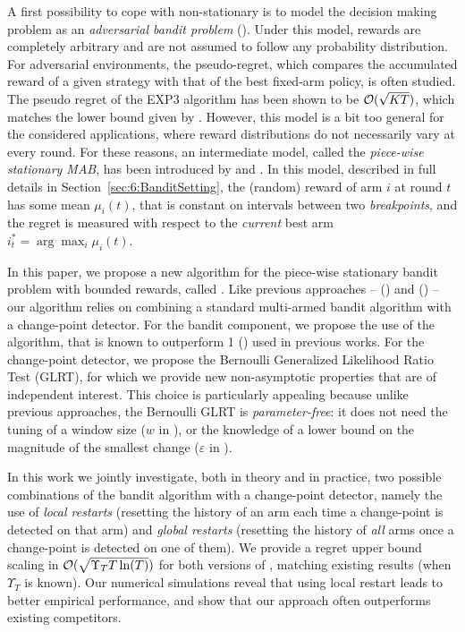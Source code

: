 A first possibility to cope with non-stationary is to model the decision making problem as an \emph{adversarial bandit problem} (\cite{Auer02NonStochastic}). Under this model, rewards are completely arbitrary and are not assumed to follow any probability distribution.
For adversarial environments, the pseudo-regret, which compares the accumulated reward of a given strategy with that of the best fixed-arm policy, is often studied. The pseudo regret of the EXP3 algorithm has been shown to be $\mathcal{O}(\sqrt{KT})$, which matches the lower bound given by \cite{Auer02NonStochastic}. However, this model is a bit too general for the considered applications, where reward distributions do not necessarily vary at every round. For these reasons, an intermediate model, called the \emph{piece-wise stationary MAB}, has been introduced by \cite{Kocsis06} and \cite{YuMannor09}.
%
In this model, described in full details in Section~\ref{sec:6:BanditSetting}, the (random) reward of arm $i$ at round $t$ has some mean $\mu_i(t)$, that is constant on intervals between two \emph{breakpoints}, and the regret is measured with respect to the \emph{current} best arm $i_t^* = \arg\max_{i} \mu_i(t)$.

In this paper, we propose a new algorithm for the piece-wise stationary bandit problem with bounded rewards, called \GLRklUCB. Like previous approaches -- \CUSUM{} (\cite{LiuLeeShroff17}) and \MUCB{} (\cite{CaoZhenKvetonXie18}) -- our algorithm relies on combining a standard multi-armed bandit algorithm with a change-point detector. For the bandit component, we propose the use of the \klUCB{} algorithm, that is known to outperform {\UCB}1 (\cite{Auer02}) used in previous works. For the change-point detector, we propose the Bernoulli Generalized Likelihood Ratio Test (GLRT), for which we provide new non-asymptotic properties that are of independent interest. This choice is particularly appealing because unlike previous approaches, the Bernoulli GLRT is \emph{parameter-free}: it does not need the tuning of a window size ($w$ in \MUCB), or the knowledge of a lower bound on the magnitude of the smallest change ($\varepsilon$ in \CUSUM).

In this work we jointly investigate, both in theory and in practice, two possible combinations of the bandit algorithm with a change-point detector, namely the use of \emph{local restarts} (resetting the history of an arm each time a change-point is detected on that arm) and \emph{global restarts} (resetting the history of \emph{all} arms once a change-point is detected on one of them).
We provide a regret upper bound scaling in $\mathcal{O}(\sqrt{\Upsilon_T T \ln(T)})$ for both versions of \GLRklUCB{}, matching existing results (when $\Upsilon_T$ is known).
Our numerical simulations reveal that using local restart leads to better empirical performance, and show that our approach often outperforms existing competitors.


